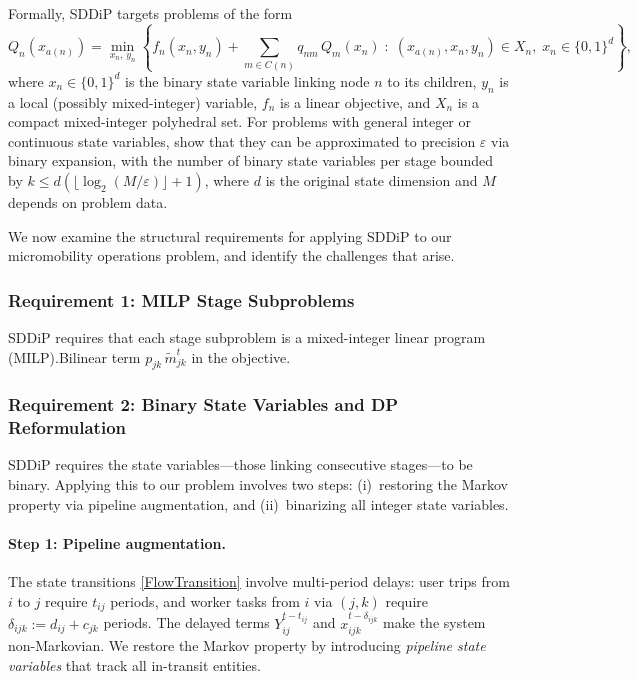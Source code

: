 \documentclass[trsc,nonblindrev]{informs3noheader}
\begin{document}
Formally, SDDiP targets problems of the form
\begin{equation}\label{eq:msip-standard}
    Q_n(x_{a(n)}) = \min_{x_n,\,y_n}\left\{
    f_n(x_n,y_n) + \sum_{m\in C(n)} q_{nm}\,Q_m(x_n)
    \;:\;
    (x_{a(n)},x_n,y_n)\in X_n,\;
    x_n\in\{0,1\}^d
    \right\},
\end{equation}
where $x_n\in\{0,1\}^d$ is the binary state variable linking node $n$ to its children, $y_n$ is a local (possibly mixed-integer) variable, $f_n$ is a linear objective, and $X_n$ is a compact mixed-integer polyhedral set. For problems with general integer or continuous state variables, \citep{zou2019stochastic} show that they can be approximated to precision $\varepsilon$ via binary expansion, with the number of binary state variables per stage bounded by $k \le d(\lfloor\log_2(M/\varepsilon)\rfloor+1)$, where $d$ is the original state dimension and $M$ depends on problem data.

We now examine the structural requirements for applying SDDiP to our micromobility operations problem, and identify the challenges that arise.


\subsubsection{Requirement 1: MILP Stage Subproblems}\label{sec:milp-req}

SDDiP requires that each stage subproblem is a mixed-integer linear program (MILP).Bilinear term $p_{jk}\,\tilde{m}_{jk}^t$ in the objective.



\subsubsection{Requirement 2: Binary State Variables and DP Reformulation}\label{sec:binary-state}

SDDiP requires the state variables---those linking consecutive stages---to be binary. Applying this to our problem involves two steps: (i)~restoring the Markov property via pipeline augmentation, and (ii)~binarizing all integer state variables.

\paragraph{Step 1: Pipeline augmentation.}
The state transitions \eqref{FlowTransition} involve multi-period delays: user trips from $i$ to $j$ require $t_{ij}$ periods, and worker tasks from $i$ via $(j,k)$ require $\delta_{ijk}:=d_{ij}+c_{jk}$ periods. The delayed terms $Y_{ij}^{t-t_{ij}}$ and $x_{ijk}^{t-\delta_{ijk}}$ make the system non-Markovian. We restore the Markov property by introducing \emph{pipeline state variables} that track all in-transit entities.
\end{document}
